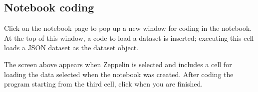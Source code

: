 \documentclass[letterpaper,10pt,english]{sphinxmanual}
\begin{document}
\subsection{Notebook coding}
\label{\detokenize{discovery/part05/use_a_notebook:id3}}
Click  on the notebook page to pop up a new window for coding in the notebook. At the top of this window, a code to load a dataset is inserted; executing this cell loads a JSON dataset as the dataset object.
\begin{quote}

\begin{figure}[H]
\centering

\noindent{}
\end{figure}
\end{quote}

The screen above appears when Zeppelin is selected and includes a cell for loading the data selected when the notebook was created. After coding the program starting from the third cell, click  when you are finished.
\end{document}
